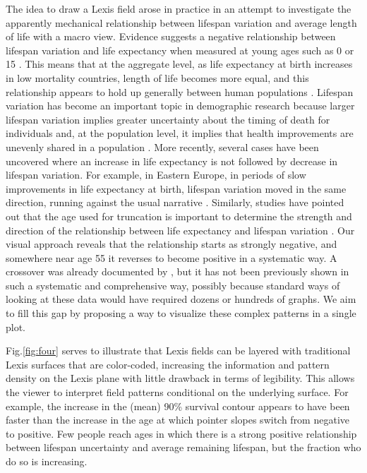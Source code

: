 \documentclass[10pt, twoside, parskip=half]{article}
\begin{document}
The idea to draw a Lexis field arose in practice in an attempt to investigate the apparently mechanical relationship between lifespan variation and average length of life with a macro view. Evidence suggests a negative relationship between lifespan variation and life expectancy when measured at young ages such as 0 or 15 \citep[\citet{smits2009length},\citet{vaupel2011life},\citet{alvarez2019latin},\citet{colchero2016emergence}]{wilmoth1999rectangularization}. This means that at the aggregate level, as life expectancy at birth increases in low mortality countries, length of life becomes more equal, and this relationship appears to hold up generally between human populations \citep{colchero2016emergence}. Lifespan variation has become an important topic in demographic research because larger lifespan variation implies greater uncertainty about the timing of death for individuals and, at the population level, it implies that health improvements are unevenly shared in a population \citep{van2018case}. More recently, several cases have been uncovered where an increase in life expectancy is not followed by decrease in lifespan variation. For example, in Eastern Europe, in periods of slow improvements in life expectancy at birth, lifespan variation moved in the same direction, running against the usual narrative \citep{aburto2018lifespan}. Similarly, studies have pointed out that the age used for truncation is important to determine the strength and direction of the relationship between life expectancy and lifespan variation \citep[\citet{nusselder1996rectangularization}, \citet{robine2001redefining}, \citet{engelman2010implications}, \citet{nemeth2017life}]{myers1984compression}.
Our visual approach reveals that the relationship starts as strongly negative, and somewhere near age 55 it reverses to become positive in a systematic way. A crossover was already documented by \citet{myers1984compression}, but it has not been previously shown in such a systematic and comprehensive way, possibly because standard ways of looking at these data would have required dozens or hundreds of graphs. We aim to fill this gap by proposing a way to visualize these complex patterns in a single plot.

Fig.\ref{fig:four} serves to illustrate that Lexis fields can be layered with traditional Lexis surfaces that are color-coded, increasing the information and pattern density on the Lexis plane with little drawback in terms of legibility. This allows the viewer to interpret field patterns conditional on the underlying surface. For example, the increase in the (mean) 90\% survival contour appears to have been faster than the increase in the age at which pointer slopes switch from negative to positive. Few people reach ages in which there is a strong positive relationship between lifespan uncertainty and average remaining lifespan, but the fraction who do so is increasing.
\end{document}
